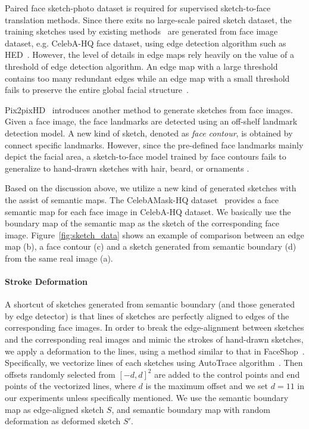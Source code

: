 

Paired face sketch-photo dataset is required for supervised sketch-to-face translation methods.
Since there exits no large-scale paired sketch dataset, the training sketches used by existing methods~\cite{pix2pix, Lines2Face} are generated from face image dataset, e.g. CelebA-HQ face dataset, using edge detection algorithm such as HED~\cite{HED}.
%
However, the level of details in edge maps rely heavily on the value of a threshold of edge detection algorithm. An edge map with a large threshold contains too many redundant edges while an edge map with a small threshold fails to preserve the entire global facial structure~\cite{Lines2Face}.

Pix2pixHD~\cite{pix2pixHD} introduces another method to generate sketches from face images. Given a face image, the face landmarks are detected using an off-shelf landmark detection model. A new kind of sketch, denoted as \textit{face contour}, is obtained by connect specific landmarks. However, since the pre-defined face landmarks mainly depict the facial area,  a sketch-to-face model trained by face contours fails to generalize to hand-drawn sketches with hair, beard, or ornaments . 

Based on the discussion above, we utilize a new kind of generated sketches with the assist of semantic maps.
The CelebAMask-HQ dataset~\cite{CelebAMask-HQ} provides a face semantic map for each face image in CelebA-HQ dataset. We basically use the boundary map of the semantic map as the sketch of the corresponding face image. Figure~\ref{fig:sketch_data} shows an example of comparison between an edge map (b), a face contour (c) and a sketch generated from semantic boundary (d) from the same real image (a).
%


\paragraph{Stroke Deformation}
A shortcut of sketches generated from semantic boundary (and those generated by edge detector) is that lines of sketches are perfectly aligned to edges of the corresponding face images. In order to break the edge-alignment between sketches and the corresponding real images and mimic the strokes of hand-drawn sketches, we apply a deformation to the lines, using a method similar to that in FaceShop~\cite{Faceshop-Portenier-TOG18}. Specifically, we vectorize lines of each sketches using AutoTrace algorithm~\cite{AutoTrace}. Then offsets randomly selected from $[-d, d]^2$ are added to the control points and end points of the vectorized lines, where $d$ is the maximum offset and we set $d=11$ in our experiments unless specifically mentioned.
%
We use the semantic boundary map as edge-aligned sketch $S$, and semantic boundary map with random deformation as deformed sketch $S'$.


